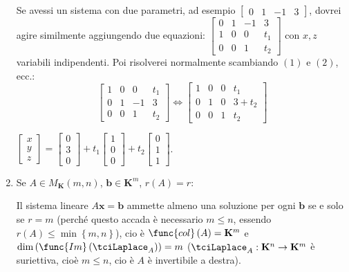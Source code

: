 \documentclass{article}
\begin{document}
\begin{enumerate}
Se avessi un sistema con due parametri, ad esempio $\left[ 
\begin{array}{cccc}
0 & 1 & -1 & 3%
\end{array}%
\right] $, dovrei agire similmente aggiungendo due equazioni: $\left[ 
\begin{array}{cccc}
0 & 1 & -1 & 3 \\ 
1 & 0 & 0 & t_{1} \\ 
0 & 0 & 1 & t_{2}%
\end{array}%
\right] $ con $x,z$ variabili indipendenti. Poi risolverei normalmente
scambiando $\left( 1\right) $ e $\left( 2\right) $, ecc.: 
\begin{equation*}
\left[ 
\begin{array}{cccc}
1 & 0 & 0 & t_{1} \\ 
0 & 1 & -1 & 3 \\ 
0 & 0 & 1 & t_{2}%
\end{array}%
\right] \Longleftrightarrow \left[ 
\begin{array}{cccc}
1 & 0 & 0 & t_{1} \\ 
0 & 1 & 0 & 3+t_{2} \\ 
0 & 0 & 1 & t_{2}%
\end{array}%
\right]
\end{equation*}

$\left[ 
\begin{array}{c}
x \\ 
y \\ 
z%
\end{array}%
\right] =\left[ 
\begin{array}{c}
0 \\ 
3 \\ 
0%
\end{array}%
\right] +t_{1}\left[ 
\begin{array}{c}
1 \\ 
0 \\ 
0%
\end{array}%
\right] +t_{2}\left[ 
\begin{array}{c}
0 \\ 
1 \\ 
1%
\end{array}%
\right] $.

\item Se $A\in M_{\mathbf{K}}\left( m,n\right) $, $\mathbf{b\in K}^{m}$, $%
r\left( A\right) =r$:

Il sistema lineare $A\mathbf{x=b}$ ammette almeno una soluzione per ogni $%
\mathbf{b}$ se e solo se $r=m$ (perch\'{e} questo accada \`{e} necessario $%
m\leq n$, essendo $r\left( A\right) \leq \min \left\{ m,n\right\} $), cio%
\`{e} $\func{col}\left( A\right) =\mathbf{K}^{m}$ e $\dim \left( \func{Im}%
\left( \tciLaplace _{A}\right) \right) =m$ ($\tciLaplace _{A}:\mathbf{K}%
^{n}\rightarrow \mathbf{K}^{m}$ \`{e} suriettiva, cio\`{e} $m\leq n$, cio%
\`{e} $A$ \`{e} invertibile a destra).


\end{enumerate}
\end{document}
